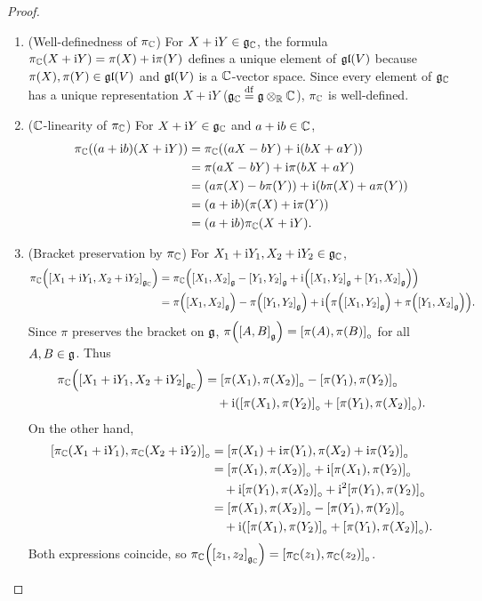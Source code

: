 \documentclass[11pt,reqno]{amsart}
\newcommand{\ii}{\mathrm{i}}
\begin{document}
\begin{proof}
\begin{enumerate}
\item (Well-definedness of $\pi_{\mathbb{C}}$)
For $X+\ii Y\in\g_\C$, the formula
$\pi_\C(X+\ii Y)=\pi(X)+\ii\pi(Y)$ defines a unique element of
$\mathfrak{gl}(V)$ because $\pi(X),\pi(Y)\in\mathfrak{gl}(V)$ and $\mathfrak{gl}(V)$ is a $\mathbb{C}$-vector space.
Since every element of $\mathfrak{g}_{\mathbb{C}}$ has a unique representation $X+\ii Y$
($\mathfrak{g}_{\mathbb{C}}\stackrel{\mathrm{df}}{=}\mathfrak{g}\otimes_{\mathbb{R}}\mathbb{C}$), $\pi_{\mathbb{C}}$ is well-defined.

\item ($\mathbb{C}$-linearity of $\pi_{\mathbb{C}}$)
For $X+\ii Y\in\g_\C$ and $a+\ii b\in\C$,
\[
\begin{aligned}
\pi_\C\Br{(a+\ii b)(X+\ii Y)}
&=\pi_\C\Br{(aX-bY)+\ii(bX+aY)} \\
&=\pi(aX-bY)+\ii\pi(bX+aY) \\
&=\Br{a\pi(X)-b\pi(Y)}+\ii\Br{b\pi(X)+a\pi(Y)} \\
&=(a+\ii b)\Br{\pi(X)+\ii\pi(Y)} \\
&=(a+\ii b)\pi_\C(X+\ii Y).
\end{aligned}
\]

\item (Bracket preservation by $\pi_{\mathbb{C}}$)
For $X_1+\ii Y_1,X_2+\ii Y_2\in\g_\C$,
\[
\begin{aligned}
\pi_\C\Br{\SqBr{X_1+\ii Y_1,X_2+\ii Y_2}_{\g_\C}}
&=\pi_\C\Br{\SqBr{X_1,X_2}_\g-\SqBr{Y_1,Y_2}_\g
+\ii\Br{\SqBr{X_1,Y_2}_\g+\SqBr{Y_1,X_2}_\g}} \\
&=\pi\Br{\SqBr{X_1,X_2}_\g}-\pi\Br{\SqBr{Y_1,Y_2}_\g}
+\ii\Br{\pi\Br{\SqBr{X_1,Y_2}_\g}+\pi\Br{\SqBr{Y_1,X_2}_\g}}.
\end{aligned}
\]
Since $\pi$ preserves the bracket on $\mathfrak{g}$,
$\pi\Br{\SqBr{A,B}_\g}=\SqBr{\pi(A),\pi(B)}_\circ$ for all $A,B\in\mathfrak{g}$.
Thus
\[
\begin{aligned}
\pi_\C\Br{\SqBr{X_1+\ii Y_1,X_2+\ii Y_2}_{\g_\C}}
&=\SqBr{\pi(X_1),\pi(X_2)}_\circ-\SqBr{\pi(Y_1),\pi(Y_2)}_\circ \\
&\quad+\ii\Br{\SqBr{\pi(X_1),\pi(Y_2)}_\circ+\SqBr{\pi(Y_1),\pi(X_2)}_\circ}.
\end{aligned}
\]
On the other hand,
\[
\begin{aligned}
\SqBr{\pi_\C(X_1+\ii Y_1),\pi_\C(X_2+\ii Y_2)}_\circ
&=\SqBr{\pi(X_1)+\ii\pi(Y_1),\pi(X_2)+\ii\pi(Y_2)}_\circ \\
&=\SqBr{\pi(X_1),\pi(X_2)}_\circ
+\ii\SqBr{\pi(X_1),\pi(Y_2)}_\circ \\
&\quad+\ii\SqBr{\pi(Y_1),\pi(X_2)}_\circ
+\ii^2\SqBr{\pi(Y_1),\pi(Y_2)}_\circ \\
&=\SqBr{\pi(X_1),\pi(X_2)}_\circ-\SqBr{\pi(Y_1),\pi(Y_2)}_\circ \\
&\quad+\ii\Br{\SqBr{\pi(X_1),\pi(Y_2)}_\circ+\SqBr{\pi(Y_1),\pi(X_2)}_\circ}.
\end{aligned}
\]
Both expressions coincide, so
$\pi_\C\Br{\SqBr{z_1,z_2}_{\g_\C}}=\SqBr{\pi_\C(z_1),\pi_\C(z_2)}_\circ$.


\end{enumerate}
\end{proof}
\end{document}
